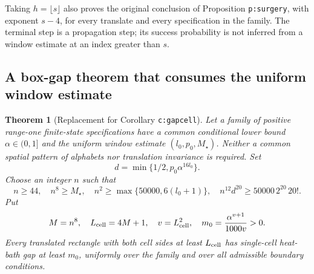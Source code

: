 \documentclass[11pt,reqno]{amsart}
\newtheorem{theorem}{Theorem}[section]
\theoremstyle{definition}
\begin{document}
Taking $h=\lfloor s\rfloor$ also proves the original conclusion of
Proposition \texttt{p:surgery}, with exponent $s-4$, for every translate
and every specification in the family. The terminal step is a
propagation step; its success probability is not inferred from a window
estimate at an index greater than $s$.

\subsection{A box-gap theorem that consumes the uniform window estimate}

\begin{theorem}[Replacement for Corollary \texttt{c:gapcell}]
\label{c:gapcell}
Let a family of positive range-one finite-state specifications have a
common conditional lower bound $\alpha\in(0,1]$ and the uniform window
estimate $(l_0,p_0,M_\star)$. Neither a common spatial pattern of
alphabets nor translation invariance is required. Set
\[
 d=\min\{1/2,p_0\alpha^{16l_0}\}.
\]
Choose an integer $n$ such that
\begin{equation}\label{e:nchoice}
 n\ge44,\quad n^8\ge M_\star,\quad
 n^2\ge\max\{50000,6(l_0+1)\},\quad
 n^{12}d^{20}\ge50000\,2^{20}\,20!.
\end{equation}
Put
\begin{equation}\label{e:cellconstants}
 M=n^8,\quad L_{\rm cell}=4M+1,\quad v=L_{\rm cell}^2,\quad
 m_0=\frac{\alpha^{v+1}}{1000v}>0.
\end{equation}
Every translated rectangle with both cell sides at least $L_{\rm cell}$
has single-cell heat-bath gap at least $m_0$, uniformly over the family
and over all admissible boundary conditions.
\end{theorem}
\end{document}
